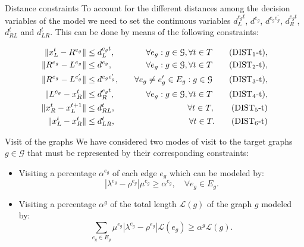 \documentclass[slidestop,usepdftitle=false,10pt]{beamer}
\begin{document}
	\begin{frame}{Distance constraints}
	    To account for the different distances among the decision variables of the model we need to set the continuous variables $d_L^{e_gt}$, $d^{e_g}$, $d^{e_ge^\prime_g}$, $d_R^{e_gt}$, $d_{RL}^t$ and $d_{LR}^t$. This can be done by means of the following constraints:
        
        \begin{align*}
        \|x_L^t- R^{e_g}\| & \leq  d_L^{e_gt},  &\quad \forall e_g:g\in \mathcal{G}, \forall t\in T \tag{DIST$_{1}$-t}, \label{eq:d1}\\
        \|R^{e_g}- L^{e_g}\| & \leq  d^{e_g},  &\quad \forall e_g:g\in \mathcal{G},\forall t\in T \tag{DIST$_{2}$-t}, \label{eq:d2}\\
        \|R^{e_g}- L^{e^\prime_g}\| & \leq  d^{e_ge^\prime_g}, &\quad \forall e_g\neq e_g'\in E_g:g\in \mathcal{G} \tag{DIST$_{3}$-t}, \label{eq:d3}\\
        \|L^{e_g}- x_R^t\| & \leq  d_R^{e_gt}, &\quad \forall e_g:g\in \mathcal{G},\forall t\in T \tag{DIST$_{4}$-t}, \label{eq:d4}\\
        \|x_R^t- x_L^{t+1}\| & \leq  d_{RL}^t, & \quad \forall t\in T, \tag{DIST$_{5}$-t} \label{eq:d5}\\
        \|x_L^t- x_R^t\| & \leq  d_{LR}^t, & \quad \forall t\in T. \tag{DIST$_{6}$-t} \label{eq:d6}\\
        \end{align*}
	\end{frame}
	
    	\begin{frame}{Visit of the graphs}
	    We have considered two modes of visit to the target graphs $g\in \mathcal{G}$ that must be represented by their corresponding constraints:
        \begin{itemize}
            \item Visiting a percentage $\alpha^{e_g}$ of each edge $e_g$ which can be modeled by:
            \begin{equation}\label{eq:alphaE}\tag{$\alpha$-E}
            |\lambda^{e_g} - \rho^{e_g}|\mu^{e_g}\geq \alpha^{e_g}, \quad \forall e_g\in E_g.
            \end{equation}
            \item Visiting a percentage $\alpha^g$ of the total length $\mathcal L(g)$ of the graph $g$ modeled by:
            \begin{equation}\label{eq:alphaG}\tag{$\alpha$-G}
            \sum_{e_g\in E_g} \mu^{e_g}|\lambda^{e_g} - \rho^{e_g}|\mathcal L(e_g) \geq \alpha^g\mathcal L(g).
            \end{equation}
        \end{itemize}
	\end{frame}
	
\end{document}
